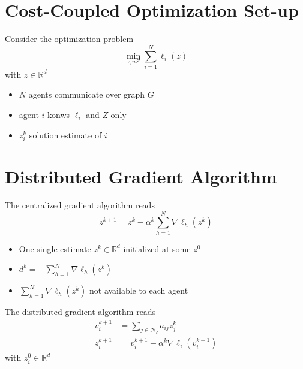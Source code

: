 \documentclass{book}
\newcommand{\R}{\mathbb{R}}
\theoremstyle{theoremv2}
\theoremstyle{defv2}
\theoremstyle{remark}
\theoremstyle{remark}
\theoremstyle{definition}
\theoremstyle{definition}
\begin{document}
\section{Cost-Coupled Optimization Set-up}
Consider the optimization problem 
\[
    \min_{z_in Z} \displaystyle\sum_{i=1}^{N}\ell_i(z)
\]
with $z\in\R^d$ 
\begin{itemize}
    \item $N$ agents communicate over graph $G$
    \item agent $i$ konws $\ell_i$ and $Z$ only 
    \item $z_i^k$ solution estimate of $i$
\end{itemize}
\section{Distributed Gradient Algorithm}
The centralized gradient algorithm reads 
\[
    z^{k+1} = z^k - \alpha^k \displaystyle\sum_{h=1}^{N} \nabla \ell_h(z^k)
\]
\begin{itemize}
    \item One single estimate $z^k\in\R^d$ initialized at some $z^0$ 
    \item $d^k = -\displaystyle\sum_{h=1}^{N}\nabla \ell_h(z^k)$
    \item $\displaystyle\sum_{h=1}^{N}\nabla \ell_h(z^k)$ not available to each agent
\end{itemize}
The distributed gradient algorithm reads
\begin{align*}
    v_i^{k+1} &= \displaystyle\sum_{j\in\mathcal{N_i}}a_{ij} z_j^k \\
    z_i^{k+1} &= v_i^{k+1} - \alpha^k \nabla\ell_i(v_i^{k+1})
\end{align*} 
with $z_i^0\in\R^d$
\end{document}
